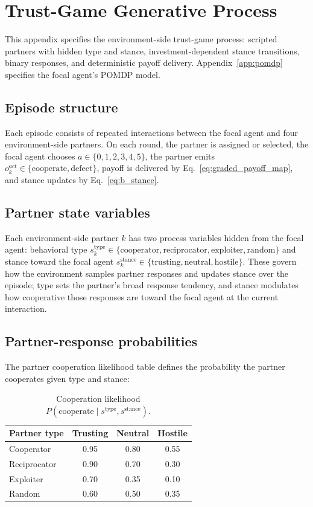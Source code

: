 \section{Trust-Game Generative Process}
\label{app:generative_process}

This appendix specifies the environment-side trust-game process: scripted partners with hidden type and stance, investment-dependent stance transitions, binary responses, and deterministic payoff delivery. Appendix~\ref{app:pomdp} specifies the focal agent's POMDP model.

\subsection{Episode structure}

Each episode consists of repeated interactions between the focal agent and four environment-side partners. On each round, the partner is assigned or selected, the focal agent chooses \(a\in\{0,1,2,3,4,5\}\), the partner emits \(o^{act}_k\in\{\mathrm{cooperate},\mathrm{defect}\}\), payoff is delivered by Eq.~\eqref{eq:graded_payoff_map}, and stance updates by Eq.~\eqref{eq:b_stance}.

\subsection{Partner state variables}

Each environment-side partner \(k\) has two process variables hidden from the focal agent: behavioral type \(s^{\mathrm{type}}_k \in \{\mathrm{cooperator},\mathrm{reciprocator},\mathrm{exploiter},\mathrm{random}\}\) and stance toward the focal agent \(s^{\mathrm{stance}}_k \in \{\mathrm{trusting},\mathrm{neutral},\mathrm{hostile}\}\). These govern how the environment samples partner responses and updates stance over the episode; type sets the partner's broad response tendency, and stance modulates how cooperative those responses are toward the focal agent at the current interaction.

\subsection{Partner-response probabilities}
\label{app:process_response}

The partner cooperation likelihood table defines the probability the partner cooperates given type and stance:

\begin{table}[H]
\centering
\caption{Cooperation likelihood $P(\text{cooperate} \mid s^{\text{type}}, s^{\text{stance}})$.}
\label{tab:coop_likelihood}
\begin{tabular}{lccc}
\toprule
Partner type & Trusting & Neutral & Hostile \\
\midrule
Cooperator & 0.95 & 0.80 & 0.55 \\
Reciprocator & 0.90 & 0.70 & 0.30 \\
Exploiter & 0.70 & 0.35 & 0.10 \\
Random & 0.60 & 0.50 & 0.35 \\
\bottomrule
\end{tabular}
\end{table}

